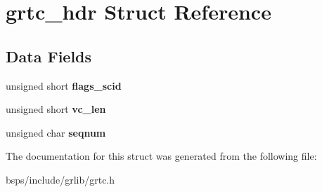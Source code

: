 \hypertarget{structgrtc__hdr}{}\section{grtc\+\_\+hdr Struct Reference}
\label{structgrtc__hdr}
\subsection*{Data Fields}
\begin{DoxyCompactItemize}
\item 
\mbox{\label{structgrtc__hdr_a8e8e7f17c1ee360e6d2d44b0695bebf3}} 
unsigned short {\bfseries flags\+\_\+scid}
\item 
\mbox{\label{structgrtc__hdr_a811a07bf258d7e2f62bed020653b1325}} 
unsigned short {\bfseries vc\+\_\+len}
\item 
\mbox{\label{structgrtc__hdr_a59bdb8fa3343c6fd86ceb87b807176ca}} 
unsigned char {\bfseries seqnum}
\end{DoxyCompactItemize}


The documentation for this struct was generated from the following file\+:\begin{DoxyCompactItemize}
\item 
bsps/include/grlib/grtc.\+h\end{DoxyCompactItemize}
